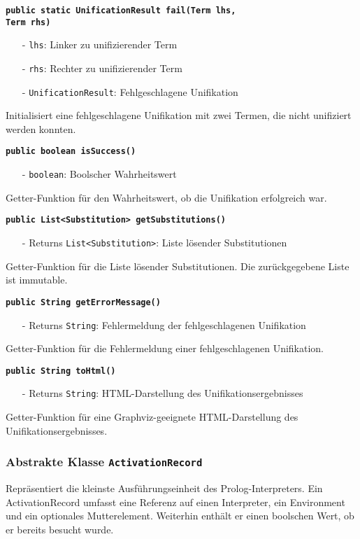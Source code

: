 \documentclass[parskip=full,11pt,twoside]{scrartcl}
\begin{document}
\textbf{\texttt{public static UnificationResult fail(Term lhs,\\Term rhs)}}
\begin{itemize}[noitemsep]
	\item[-] \texttt{lhs}: Linker zu unifizierender Term
	\item[-] \texttt{rhs}: Rechter zu unifizierender Term
	\item[-] \texttt{UnificationResult}: Fehlgeschlagene Unifikation
\end{itemize}
Initialisiert eine fehlgeschlagene Unifikation mit zwei Termen, die nicht unifiziert werden konnten.

\textbf{\texttt{public boolean isSuccess()}}
\begin{itemize}[noitemsep]
	\item[-] \texttt{boolean}: Boolscher Wahrheitswert
\end{itemize}
Getter-Funktion für den Wahrheitswert, ob die Unifikation erfolgreich war.

\textbf{\texttt{public List<Substitution> getSubstitutions()}}
\begin{itemize}[noitemsep]
	\item[-] Returns \texttt{List<Substitution>}: Liste lösender Substitutionen
\end{itemize}
Getter-Funktion für die Liste lösender Substitutionen. Die zurückgegebene Liste ist immutable.

\textbf{\texttt{public String getErrorMessage()}}
\begin{itemize}[noitemsep]
	\item[-] Returns \texttt{String}: Fehlermeldung der fehlgeschlagenen Unifikation
\end{itemize}
Getter-Funktion für die Fehlermeldung einer fehlgeschlagenen Unifikation.

\textbf{\texttt{public String toHtml()}}
\begin{itemize}[noitemsep]
	\item[-] Returns \texttt{String}: HTML-Darstellung des Unifikationsergebnisses
\end{itemize}
Getter-Funktion für eine Graphviz-geeignete HTML-Darstellung des Unifikationsergebnisses.

\subsubsection{Abstrakte Klasse \texttt{ActivationRecord}}
Repräsentiert die kleinste Ausführungseinheit des Prolog-Interpreters. Ein ActivationRecord umfasst eine Referenz auf einen Interpreter, ein Environment und ein optionales Mutterelement. Weiterhin enthält er einen boolschen Wert, ob er bereits besucht wurde.
\end{document}
